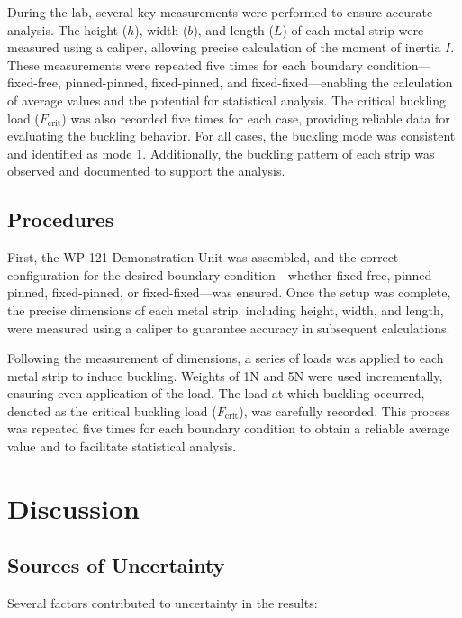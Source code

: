 \documentclass[12pt]{article}
\begin{document}
During the lab, several key measurements were performed to ensure accurate analysis. The height (\( h \)), width (\( b \)), and length (\( L \)) of each metal strip were measured using a caliper, allowing precise calculation of the moment of inertia \( I \). These measurements were repeated five times for each boundary condition—fixed-free, pinned-pinned, fixed-pinned, and fixed-fixed—enabling the calculation of average values and the potential for statistical analysis. The critical buckling load (\( F_{\text{crit}} \)) was also recorded five times for each case, providing reliable data for evaluating the buckling behavior. For all cases, the buckling mode was consistent and identified as mode 1. Additionally, the buckling pattern of each strip was observed and documented to support the analysis.


\subsection{Procedures}
\label{subsec:procedure}

First, the WP 121 Demonstration Unit was assembled, and the correct configuration for the desired boundary condition—whether fixed-free, pinned-pinned, fixed-pinned, or fixed-fixed—was ensured. Once the setup was complete, the precise dimensions of each metal strip, including height, width, and length, were measured using a caliper to guarantee accuracy in subsequent calculations.

Following the measurement of dimensions, a series of loads was applied to each metal strip to induce buckling. Weights of 1N and 5N were used incrementally, ensuring even application of the load. The load at which buckling occurred, denoted as the critical buckling load (\( F_{\text{crit}} \)), was carefully recorded. This process was repeated five times for each boundary condition to obtain a reliable average value and to facilitate statistical analysis.

\section{Discussion}
\label{sec:discussion}

\subsection{Sources of Uncertainty}
\label{subsec:uncertainty}

Several factors contributed to uncertainty in the results:
\end{document}
